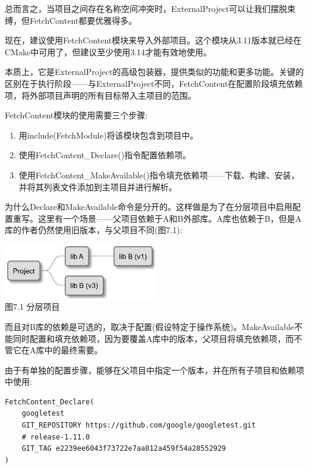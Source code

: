 总而言之，当项目之间存在名称空间冲突时，ExternalProject可以让我们摆脱束缚，但FetchContent都要优雅得多。


现在，建议使用FetchContent模块来导入外部项目。这个模块从3.11版本就已经在CMake中可用了，但建议至少使用3.14才能有效地使用。

本质上，它是ExternalProject的高级包装器，提供类似的功能和更多功能。关键的区别在于执行阶段——与ExternalProject不同，FetchContent在配置阶段填充依赖项，将外部项目声明的所有目标带入主项目的范围。

FetchContent模块的使用需要三个步骤:

\begin{enumerate}
\item 
用include(FetchModule)将该模块包含到项目中。

\item 
使用FetchContent\_Declare()指令配置依赖项。

\item 
使用FetchContent\_MakeAvailable()指令填充依赖项——下载、构建、安装，并将其列表文件添加到主项目并进行解析。
\end{enumerate}

为什么Declare和MakeAvailable命令是分开的。这样做是为了在分层项目中启用配置重写。这里有一个场景——父项目依赖于A和B外部库。A库也依赖于B，但是A库的作者仍然使用旧版本，与父项目不同(图7.1):

\begin{center}
\includegraphics[width=0.5\textwidth]{content/2/chapter7/images/1.jpg}\\
图7.1 分层项目
\end{center}

而且对B库的依赖是可选的，取决于配置(假设特定于操作系统)。MakeAvailable不能同时配置和填充依赖项，因为要覆盖A库中的版本，父项目将填充依赖项，而不管它在A库中的最终需要。

由于有单独的配置步骤，能够在父项目中指定一个版本，并在所有子项目和依赖项中使用:

\begin{lstlisting}[style=styleCMake]
FetchContent_Declare(
	googletest
	GIT_REPOSITORY https://github.com/google/googletest.git
	# release-1.11.0
	GIT_TAG e2239ee6043f73722e7aa812a459f54a28552929
)
\end{lstlisting} 

